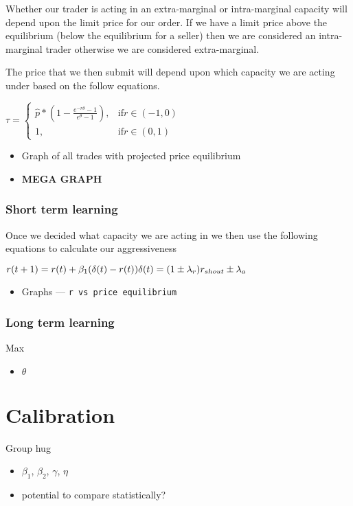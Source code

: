 \documentclass[12pt]{article} %
\begin{document}
Whether our trader is acting in an extra-marginal or intra-marginal capacity
will depend upon the limit price for our order. If we have a limit price above
the equilibrium (below the equilibrium for a seller) then we are considered an
intra-marginal trader otherwise we are considered extra-marginal.

The price that we then submit will depend upon which capacity we are acting
under based on the follow equations.

$\tau = 
\begin{cases}
      \hat{p}*(1- \frac{e^{-r\theta}-1}{e^{\theta}-1}), & \text{if} r \in (-1,0)  \\
      1, & \text{if} r \in (0,1) 
\end{cases}
$
\begin{itemize} \itemsep0pt
	\item Graph of all trades with projected price equilibrium
	\item \textbf{MEGA GRAPH}
\end{itemize}


\subsubsection{Short term learning}
Once we decided what capacity we are acting in we then use the following
equations to calculate our aggressiveness

$r(t+1) = r(t) + \beta_1(\delta(t) - r(t))\\\delta(t) = (1 \pm
\lambda_r)r_{shout} \pm \lambda_a$
\begin{itemize} \itemsep0pt
	\item Graphs --- \tt r \rm vs price equilibrium
\end{itemize}

\subsubsection{Long term learning}
Max
\begin{itemize} \itemsep0pt
	\item $\theta$
\end{itemize}



\section{Calibration}
Group hug
\begin{itemize} \itemsep0pt
	\item $\beta_1$, $\beta_2$, $\gamma$, $\eta$
	\item potential to compare statistically?
\end{itemize}
\end{document}
